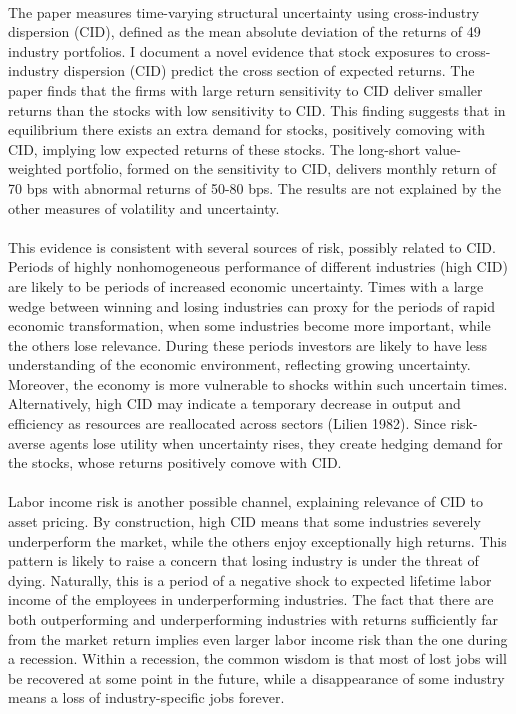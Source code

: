 \documentclass[12pt]{article}
\begin{document}
\paragraph{}
The paper measures time-varying structural uncertainty using cross-industry dispersion (CID), defined as the mean absolute deviation of the returns of 49 industry portfolios. I document a novel evidence that stock exposures to cross-industry dispersion (CID) predict the cross section of expected returns. The paper finds that the firms with large return sensitivity to CID deliver smaller returns than the stocks with low sensitivity to CID. This finding suggests that in equilibrium there exists an extra demand for stocks, positively comoving with CID, implying low expected returns of these stocks. The long-short value-weighted portfolio, formed on the sensitivity to CID, delivers monthly return of 70 bps with abnormal returns of 50-80 bps. The results are not explained by the other measures of volatility and uncertainty.
\paragraph{}
This evidence is consistent with several sources of risk, possibly related to CID. Periods of highly nonhomogeneous performance of different industries (high CID) are likely to be periods of increased economic uncertainty. Times with a large wedge between winning and losing industries can proxy for the periods of rapid economic transformation, when some industries become more important, while the others lose relevance. During these periods investors are likely to have less understanding of the economic environment, reflecting growing uncertainty. Moreover, the economy is more vulnerable to shocks within such uncertain times. Alternatively, high CID may indicate a temporary decrease in output and efficiency as resources are reallocated across sectors (Lilien 1982). Since risk-averse agents lose utility when uncertainty rises, they create hedging demand for the stocks, whose returns positively comove with CID.
\paragraph{}
Labor income risk is another possible channel, explaining relevance of CID to asset pricing. By construction, high CID means that some industries severely underperform the market, while the others enjoy exceptionally high returns. This pattern is likely to raise a concern that losing industry is under the threat of dying. Naturally, this is a period of a negative shock to expected lifetime labor income of the employees in underperforming industries. The fact that there are both outperforming and underperforming industries with returns sufficiently far from the market return implies even larger labor income risk than the one during a recession. Within a recession, the common wisdom is that most of lost jobs will be recovered at some point in the future, while a disappearance of some industry means a loss of industry-specific jobs forever. 
\end{document}
